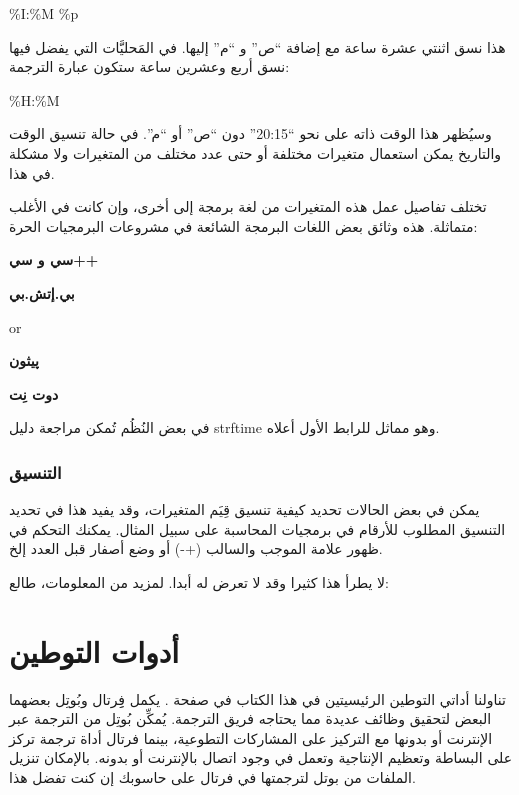 \%I:\%M \%p

هذا نسق اثنتي عشرة ساعة مع إضافة “ص” و “م” إليها. في المَحليَّات التي
يفضل فيها نسق أربع وعشرين ساعة ستكون عبارة الترجمة:

\%H:\%M

وسيُظهر هذا الوقت ذاته على نحو “20:15” دون “ص” أو “م”. في حالة تنسيق
الوقت والتاريخ يمكن استعمال متغيرات مختلفة أو حتى عدد مختلف من
المتغيرات ولا مشكلة في هذا.

تختلف تفاصيل عمل هذه المتغيرات من لغة برمجة إلى أخرى، وإن كانت في الأغلب
متماثلة. هذه وثائق بعض اللغات البرمجة الشائعة في مشروعات البرمجيات
الحرة:

\startitemize[1]
\item {\bf
سي و سي++}

\item {\bf
بي.إتش.بي}

  or 
\item {\bf
پيثون}

\item {\bf
دوت نِت}

\stopitemize
في بعض النُظُم تُمكن مراجعة دليل strftime وهو مماثل للرابط الأول أعلاه.

\subsection{التنسيق}
يمكن في بعض الحالات تحديد كيفية تنسيق قِيَم المتغيرات، وقد يفيد هذا في
تحديد التنسيق المطلوب للأرقام في برمجيات المحاسبة على سبيل المثال.
يمكنك التحكم في ظهور علامة الموجب والسالب (+ -) أو وضع
أصفار قبل العدد إلخ.

لا يطرأ هذا كثيرا وقد لا تعرض له أبدا. لمزيد من المعلومات، طالع:


\chapter[ref:30364807]{أدوات التوطين}
تناولنا أداتي التوطين الرئيسيتين
في هذا الكتاب في صفحة \at[ref:20165030]. يكمل فِِرتال وبُوتِل
بعضهما البعض لتحقيق وظائف عديدة مما يحتاجه فريق الترجمة. يُمكِّن بُوتِل
من الترجمة عبر الإنترنت أو بدونها مع التركيز على المشاركات التطوعية،
بينما فرتال أداة ترجمة تركز على البساطة وتعظيم الإنتاجية وتعمل في وجود
اتصال بالإنترنت أو بدونه. بالإمكان تنزيل الملفات من بوتل لترجمتها في
فرتال على حاسوبك إن كنت تفضل هذا.

